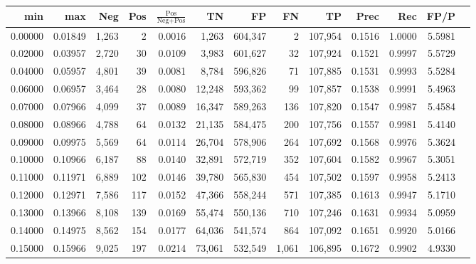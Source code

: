 \begin{tabular}{rrrrrrrrrrrrr}
\toprule
    min &     max &    Neg &   Pos & $\frac{\text{Pos}}{\text{Neg}+\text{Pos}}$ &      TN &      FP &      FN &      TP &   Prec &    Rec &   FP/P \\
\midrule
0.00000 & 0.01849 &  1,263 &     2 &                                     0.0016 &   1,263 & 604,347 &       2 & 107,954 & 0.1516 & 1.0000 & 5.5981 \\
0.02000 & 0.03957 &  2,720 &    30 &                                     0.0109 &   3,983 & 601,627 &      32 & 107,924 & 0.1521 & 0.9997 & 5.5729 \\
0.04000 & 0.05957 &  4,801 &    39 &                                     0.0081 &   8,784 & 596,826 &      71 & 107,885 & 0.1531 & 0.9993 & 5.5284 \\
0.06000 & 0.06957 &  3,464 &    28 &                                     0.0080 &  12,248 & 593,362 &      99 & 107,857 & 0.1538 & 0.9991 & 5.4963 \\
0.07000 & 0.07966 &  4,099 &    37 &                                     0.0089 &  16,347 & 589,263 &     136 & 107,820 & 0.1547 & 0.9987 & 5.4584 \\
0.08000 & 0.08966 &  4,788 &    64 &                                     0.0132 &  21,135 & 584,475 &     200 & 107,756 & 0.1557 & 0.9981 & 5.4140 \\
0.09000 & 0.09975 &  5,569 &    64 &                                     0.0114 &  26,704 & 578,906 &     264 & 107,692 & 0.1568 & 0.9976 & 5.3624 \\
0.10000 & 0.10966 &  6,187 &    88 &                                     0.0140 &  32,891 & 572,719 &     352 & 107,604 & 0.1582 & 0.9967 & 5.3051 \\
0.11000 & 0.11971 &  6,889 &   102 &                                     0.0146 &  39,780 & 565,830 &     454 & 107,502 & 0.1597 & 0.9958 & 5.2413 \\
0.12000 & 0.12971 &  7,586 &   117 &                                     0.0152 &  47,366 & 558,244 &     571 & 107,385 & 0.1613 & 0.9947 & 5.1710 \\
0.13000 & 0.13966 &  8,108 &   139 &                                     0.0169 &  55,474 & 550,136 &     710 & 107,246 & 0.1631 & 0.9934 & 5.0959 \\
0.14000 & 0.14975 &  8,562 &   154 &                                     0.0177 &  64,036 & 541,574 &     864 & 107,092 & 0.1651 & 0.9920 & 5.0166 \\
0.15000 & 0.15966 &  9,025 &   197 &                                     0.0214 &  73,061 & 532,549 &   1,061 & 106,895 & 0.1672 & 0.9902 & 4.9330 \\

\end{tabular}

